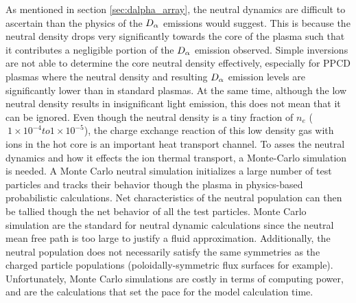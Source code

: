 As mentioned in section \ref{sec:dalpha_array}, the neutral dynamics are difficult to ascertain than the physics of the $D_{\alpha}$ emissions would suggest. This is because the neutral density drops very significantly towards the core of the plasma such that it contributes a negligible portion of the $D_{\alpha}$ emission observed. Simple inversions are not able to determine the core neutral density effectively, especially for PPCD plasmas where the neutral density and resulting $D_{\alpha}$ emission levels are significantly lower than in standard plasmas. At the same time, although the low neutral density results in insignificant light emission, this does not mean that it can be ignored. Even though the neutral density is a tiny fraction of $n_e$ ($~1\times 10^{-4} to 1\times 10^{-5}$), the charge exchange reaction of this low density gas with ions in the hot core is an important heat transport channel. To asses the neutral dynamics and how it effects the ion thermal transport, a Monte-Carlo simulation is needed. A Monte Carlo neutral simulation initializes a large number of test particles and tracks their behavior though the plasma in physics-based probabilistic calculations. Net characteristics of the neutral population can then be tallied though the net behavior of all the test particles. Monte Carlo simulation are the standard for neutral dynamic calculations since the neutral mean free path is too large to justify a fluid approximation. Additionally, the neutral population does not necessarily satisfy the same symmetries as the charged particle populations (poloidally-symmetric flux surfaces for example). Unfortunately, Monte Carlo simulations are costly in terms of computing power, and are the calculations that set the pace for the model calculation time. 


